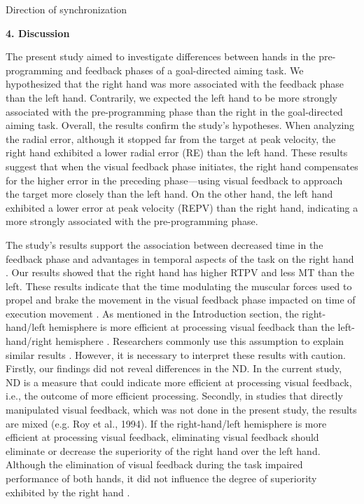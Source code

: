 \documentclass[man,a4paper,12pt,floatsintext]{apa6}
\begin{document}
Direction of synchronization


	
\begin{flushleft}
\textbf{4. Discussion}
\end{flushleft}

The present study aimed to investigate differences between hands in the pre-programming and feedback phases of a goal-directed aiming task. We hypothesized that the right hand was more associated with the feedback phase than the left hand. Contrarily, we expected the left hand to be more strongly associated with the pre-programming phase than the right in the goal-directed aiming task. Overall, the results confirm the study’s hypotheses. When analyzing the radial error, although it stopped far from the target at peak velocity, the right hand exhibited a lower radial error (RE) than the left hand. These results suggest that when the visual feedback phase initiates, the right hand compensates for the higher error in the preceding phase—using visual feedback to approach the target more closely than the left hand. On the other hand, the left hand exhibited a lower error at peak velocity (REPV) than the right hand, indicating a more strongly associated with the pre-programming phase.


The study's results support the association between decreased time in the feedback phase and advantages in temporal aspects of the task on the right hand \citep{Lavrysen2012b}. Our results showed that the right hand has higher RTPV and less MT than the left. These results indicate that the time modulating the muscular forces used to propel and brake the movement in the visual feedback phase impacted on time of execution movement \citep{Todor1978}. As mentioned in the Introduction section, the right-hand/left hemisphere is more efficient at processing visual feedback than the left-hand/right hemisphere \citep{Flowers1975a}. Researchers commonly use this assumption to explain similar results \citep{Lavrysen2012b,Roy1994,Buekers2000}. However, it is necessary to interpret these results with caution. Firstly, our findings did not reveal differences in the ND. In the current study, ND is a measure that could indicate more efficient at processing visual feedback, i.e., the outcome of more efficient processing. Secondly, in studies that directly manipulated visual feedback, which was not done in the present study, the results are mixed (e.g. Roy et al., 1994). If the right-hand/left hemisphere is more efficient at processing visual feedback, eliminating visual feedback should eliminate or decrease the superiority of the right hand over the left hand. Although the elimination of visual feedback during the task impaired performance of both hands, it did not influence the degree of superiority exhibited by the right hand \citep{Carson1990}. 
  
\end{document}
